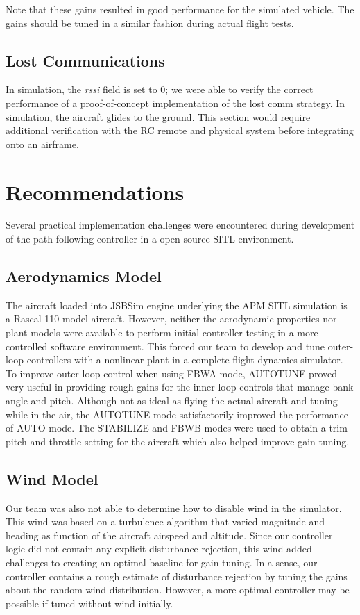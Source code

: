 \documentclass{aiaa}
\begin{document}
Note that these gains resulted in good performance for the simulated vehicle. The gains should be tuned in a similar fashion during actual flight tests.

\subsection{Lost Communications}
In simulation, the \textit{rssi} field is set to 0; we were able to verify the correct performance of a proof-of-concept implementation of the lost comm strategy. In simulation, the aircraft glides to the ground. This section would require additional verification with the RC remote and physical system before integrating onto an airframe.
\section{Recommendations}
Several practical implementation challenges were encountered during development of the path following controller in a open-source SITL environment.
\subsection{Aerodynamics Model}
The aircraft loaded into JSBSim engine underlying the APM SITL simulation is a Rascal 110 model aircraft. However, neither the aerodynamic properties nor plant models were available to perform initial controller testing in a more controlled software environment. This forced our team to develop and tune outer-loop controllers with a nonlinear plant in a complete flight dynamics simulator. To improve outer-loop control when using FBWA mode, AUTOTUNE proved very useful in providing rough gains for the inner-loop controls that manage bank angle and pitch. Although not as ideal as flying the actual aircraft and tuning while in the air, the AUTOTUNE mode satisfactorily improved the performance of AUTO mode. The STABILIZE and FBWB modes were used to obtain a trim pitch and throttle setting for the aircraft which also helped improve gain tuning.
\subsection{Wind Model}
 Our team was also not able to determine how to disable wind in the simulator. This wind was based on a turbulence algorithm that varied magnitude and heading as function of the aircraft airspeed and altitude. Since our controller logic did not contain any explicit disturbance rejection, this wind added challenges to creating an optimal baseline for gain tuning. In a sense, our controller contains a rough estimate of disturbance rejection by tuning the gains about the random wind distribution. However, a more optimal controller may be possible if tuned without wind initially.
\end{document}
